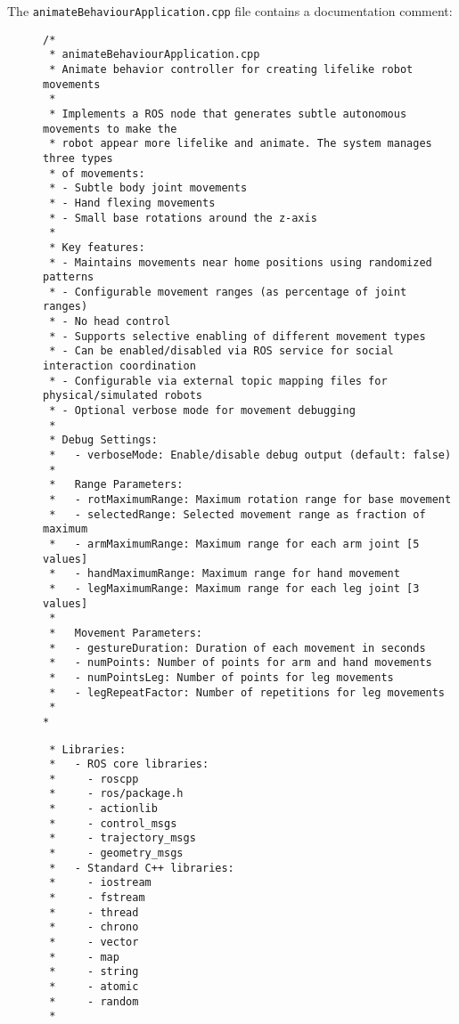 \documentclass{CSSRforAfrica}
\newcommand{\checkboxChecked}{\fbox{\ding{51}}} %
\begin{document}
\noindent The {\small \verb+animateBehaviourApplication.cpp+} file contains a documentation comment:

\begin{description}

\item[\checkboxChecked] 
 {\small 
\begin{verbatim}
/*
 * animateBehaviourApplication.cpp
 * Animate behavior controller for creating lifelike robot movements
 * 
 * Implements a ROS node that generates subtle autonomous movements to make the 
 * robot appear more lifelike and animate. The system manages three types 
 * of movements:
 * - Subtle body joint movements
 * - Hand flexing movements
 * - Small base rotations around the z-axis
 * 
 * Key features:
 * - Maintains movements near home positions using randomized patterns
 * - Configurable movement ranges (as percentage of joint ranges)
 * - No head control
 * - Supports selective enabling of different movement types
 * - Can be enabled/disabled via ROS service for social interaction coordination
 * - Configurable via external topic mapping files for physical/simulated robots
 * - Optional verbose mode for movement debugging
 * 
 * Debug Settings:
 *   - verboseMode: Enable/disable debug output (default: false)
 *   
 *   Range Parameters:
 *   - rotMaximumRange: Maximum rotation range for base movement 
 *   - selectedRange: Selected movement range as fraction of maximum 
 *   - armMaximumRange: Maximum range for each arm joint [5 values] 
 *   - handMaximumRange: Maximum range for hand movement 
 *   - legMaximumRange: Maximum range for each leg joint [3 values] 
 *   
 *   Movement Parameters:
 *   - gestureDuration: Duration of each movement in seconds 
 *   - numPoints: Number of points for arm and hand movements 
 *   - numPointsLeg: Number of points for leg movements 
 *   - legRepeatFactor: Number of repetitions for leg movements
 * 
*
\end{verbatim}}

\item[\checkboxChecked] 
 {\small 
\begin{verbatim}
 * Libraries:
 *   - ROS core libraries:
 *     - roscpp
 *     - ros/package.h
 *     - actionlib
 *     - control_msgs
 *     - trajectory_msgs
 *     - geometry_msgs
 *   - Standard C++ libraries:
 *     - iostream
 *     - fstream
 *     - thread
 *     - chrono
 *     - vector
 *     - map
 *     - string
 *     - atomic
 *     - random
 * 
\end{verbatim}}


\end{description}
\end{document}
